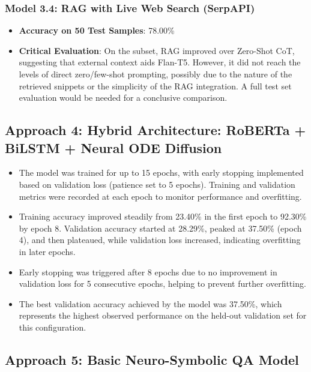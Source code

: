 \documentclass[10.5pt]{article}
\begin{document}
\subsubsection{Model 3.4: RAG with Live Web Search (SerpAPI)}
\begin{itemize}
    \item \textbf{Accuracy on 50 Test Samples}: 78.00\%
    \item \textbf{Critical Evaluation}: On the subset, RAG improved over Zero-Shot CoT, suggesting that external context aids Flan-T5. However, it did not reach the levels of direct zero/few-shot prompting, possibly due to the nature of the retrieved snippets or the simplicity of the RAG integration. A full test set evaluation would be needed for a conclusive comparison.
\end{itemize}

\subsection{Approach 4: Hybrid Architecture: RoBERTa + BiLSTM + Neural ODE Diffusion}

\begin{itemize}
    \item The model was trained for up to 15 epochs, with early stopping implemented based on validation loss (patience set to 5 epochs). Training and validation metrics were recorded at each epoch to monitor performance and overfitting.
    
    \item Training accuracy improved steadily from 23.40\% in the first epoch to 92.30\% by epoch 8. Validation accuracy started at 28.29\%, peaked at 37.50\% (epoch 4), and then plateaued, while validation loss increased, indicating overfitting in later epochs.
    
    \item Early stopping was triggered after 8 epochs due to no improvement in validation loss for 5 consecutive epochs, helping to prevent further overfitting.
    
    \item The best validation accuracy achieved by the model was 37.50\%, which represents the highest observed performance on the held-out validation set for this configuration.

\end{itemize}

\subsection{Approach 5: Basic Neuro-Symbolic QA Model}
\end{document}
